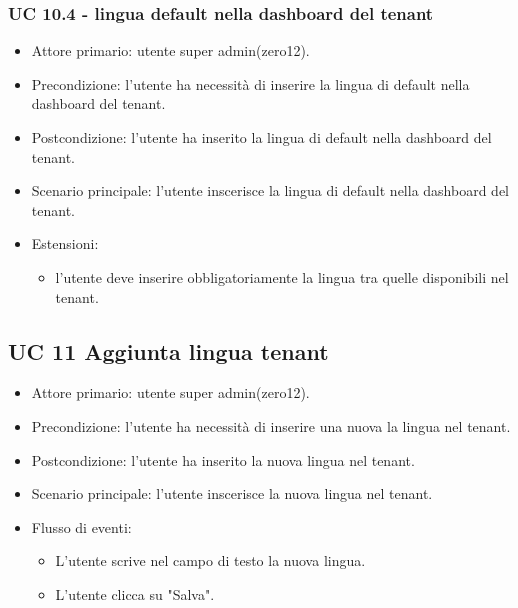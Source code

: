         \subsubsection{UC 10.4 - lingua default nella dashboard del tenant}
        \begin{itemize}
            \item Attore primario: utente super admin(zero12).
            \item Precondizione: l'utente ha necessità di inserire la lingua di default nella dashboard del tenant.
            \item Postcondizione: l'utente ha inserito la lingua di default nella dashboard del tenant.
            \item Scenario principale: l'utente inscerisce la lingua di default nella dashboard del tenant.
            \item Estensioni: 
                \begin{itemize}
                    \item l'utente deve inserire obbligatoriamente la lingua tra quelle disponibili nel tenant.
                \end{itemize}
        \end{itemize}
\subsection{UC 11 Aggiunta lingua tenant}
    \begin{itemize}
        \item Attore primario: utente super admin(zero12).
        \item Precondizione: l'utente ha necessità di inserire una nuova la lingua nel tenant.
        \item Postcondizione: l'utente ha inserito la nuova lingua nel tenant.
        \item Scenario principale: l'utente inscerisce la nuova lingua nel tenant.
        \item Flusso di eventi:
            \begin{itemize}
                \item L'utente scrive nel campo di testo la nuova lingua.
                \item L'utente clicca su "Salva".
            \end{itemize}
        \end{itemize}
